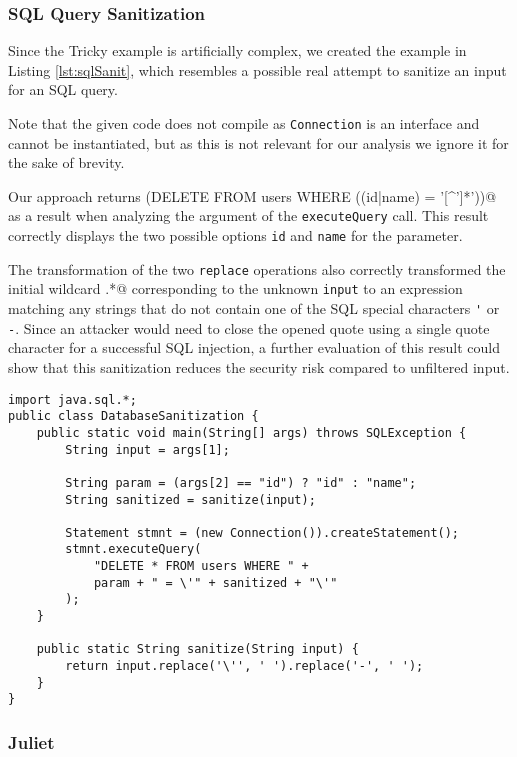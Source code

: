 \newpage
\subsubsection{SQL Query Sanitization}

Since the Tricky example is artificially complex, we created the example in Listing \ref{lst:sqlSanit}, which resembles a possible real attempt to sanitize an input for an SQL query.

Note that the given code does not compile as \lstinline|Connection| is an interface and cannot be instantiated, but as this is not relevant for our analysis we ignore it for the sake of brevity.

Our approach returns \Verb@(DELETE \* FROM users WHERE ((id|name) = '[^'\-]*'))@ as a result when analyzing the argument of the \lstinline|executeQuery| call. This result correctly displays the two possible options \lstinline|id| and \lstinline|name| for the parameter.

The transformation of the two \lstinline|replace| operations also correctly transformed the initial wildcard \Verb@.*@ corresponding to the unknown \lstinline|input| to an expression matching any strings that do not contain one of the SQL special characters \lstinline|'| or \lstinline|-|. Since an attacker would need to close the opened quote using a single quote character for a successful SQL injection, a further evaluation of this result could show that this sanitization reduces the security risk compared to unfiltered input.

\begin{lstlisting}[float, escapechar=|, numbers=right, caption=SQL query sanitization example, label=lst:sqlSanit,basicstyle=\small\ttfamily]
import java.sql.*;
public class DatabaseSanitization {
	public static void main(String[] args) throws SQLException {
		String input = args[1];
		
		String param = (args[2] == "id") ? "id" : "name";
		String sanitized = sanitize(input);
		
		Statement stmnt = (new Connection()).createStatement();
		stmnt.executeQuery(
			"DELETE * FROM users WHERE " + 
			param + " = \'" + sanitized + "\'"
		);
	}
	
	public static String sanitize(String input) {
		return input.replace('\'', ' ').replace('-', ' ');
	}
}
\end{lstlisting}

\subsubsection{Juliet}

